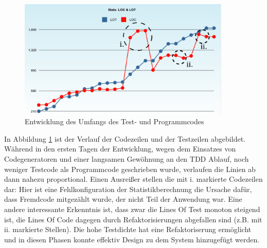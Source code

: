 \begin{figure}[htbp]
 \centering
 \includegraphics[width=0.9\textwidth]{./diagrams/itjobs-loclot.pdf}
 \caption{Entwicklung des Umfangs des Test- und Programmcodes}
 \label{fig:itjobsLoc}
\end{figure}

In Abbildung \ref{fig:itjobsLoc} ist der Verlauf der Codezeilen und der Testzeilen abgebildet. Während in den ersten Tagen der Entwicklung, wegen dem Einsatzes von Codegeneratoren und einer langsamen Gewöhnung an den TDD Ablauf, noch weniger Testcode als Programmcode geschrieben wurde, verlaufen die Linien ab dann nahezu proportional. Einen Ausreißer stellen die mit i. markierte Codezeilen dar: Hier ist eine Fehlkonfiguration der Statistikberechnung die Ursache dafür, dass Fremdcode mitgezählt wurde, der nicht Teil der Anwendung war. Eine andere interessante Erkenntnis ist, dass zwar die Lines Of Test monoton steigend ist, die Lines Of Code dagegen durch Refaktorisierungen abgefallen sind (z.B. mit ii. markierte Stellen). Die hohe Testdichte hat eine Refaktoriserung ermöglicht und in diesen Phasen konnte effektiv Design zu dem System hinzugefügt werden.



